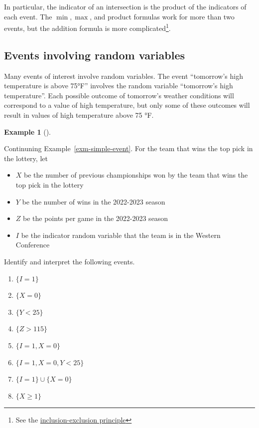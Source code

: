 \documentclass[
  letterpaper,
  DIV=11,
  numbers=noendperiod]{scrreprt}
\providecommand{\tightlist}{%
  \setlength{\itemsep}{0pt}\setlength{\parskip}{0pt}}
\theoremstyle{plain}
\theoremstyle{definition}
\newtheorem{example}{Example}[chapter]
\theoremstyle{definition}
\theoremstyle{definition}
\theoremstyle{remark}
\begin{document}
In particular, the indicator of an intersection is the product of the
indicators of each event. The \(\min, \max\), and product formulas work
for more than two events, but the addition formula is more
complicated\footnote{See the
  \href{https://mathworld.wolfram.com/Inclusion-ExclusionPrinciple.html}{inclusion-exclusion
  principle}}.

\subsection{Events involving random
variables}\label{events-involving-random-variables}

Many events of interest involve random variables. The event ``tomorrow's
high temperature is above 75°F'' involves the random variable
``tomorrow's high temperature''. Each possible outcome of tomorrow's
weather conditions will correspond to a value of high temperature, but
only some of these outcomes will result in values of high temperature
above 75 °F.

\begin{tcolorbox}[enhanced jigsaw, opacityback=0, left=2mm, colframe=quarto-callout-note-color-frame, toprule=.15mm, breakable, colback=white, leftrule=.75mm, arc=.35mm, rightrule=.15mm, bottomrule=.15mm]

\begin{example}[]\protect\hypertarget{exm-rv-event-simple}{}\label{exm-rv-event-simple}

Continuning Example~\ref{exm-simple-event}. For the team that wins the
top pick in the lottery, let

\begin{itemize}
\tightlist
\item
  \(X\) be the number of previous championships won by the team that
  wins the top pick in the lottery
\item
  \(Y\) be the number of wins in the 2022-2023 season
\item
  \(Z\) be the points per game in the 2022-2023 season
\item
  \(I\) be the indicator random variable that the team is in the Western
  Conference
\end{itemize}

Identify and interpret the following events.

\begin{enumerate}
\def\labelenumi{\arabic{enumi}.}
\tightlist
\item
  \(\{I=1\}\)
\item
  \(\{X = 0\}\)
\item
  \(\{Y < 25\}\)
\item
  \(\{Z > 115\}\)
\item
  \(\{I = 1, X = 0\}\)
\item
  \(\{I = 1, X = 0, Y < 25\}\)
\item
  \(\{I = 1\}\cup \{X = 0\}\)
\item
  \(\{X \ge 1\}\)
\end{enumerate}

\end{example}

\end{tcolorbox}
\end{document}

